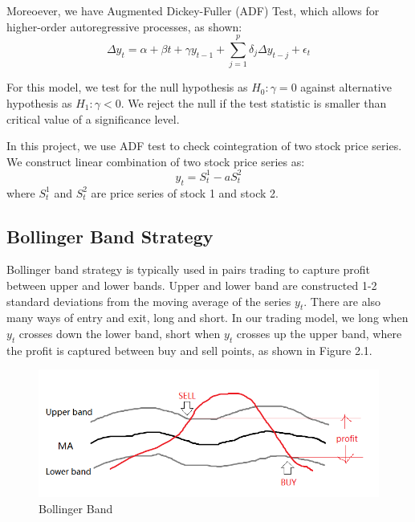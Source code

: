 Moreoever, we have Augmented Dickey-Fuller (ADF) Test, which allows for higher-order autoregressive processes, as shown:\cite{study:coint}
\begin{equation}
\Delta y_t = \alpha + \beta t + \gamma y_{t-1} + \sum_{j=1}^{p} \delta_j \Delta y_{t-j} + \epsilon_t
\end{equation}

For this model, we test for the null hypothesis as \(H_0: \gamma = 0\) against alternative hypothesis as \(H_1: \gamma < 0\). We reject the null if the test statistic is smaller than critical value of a significance level. 

In this project, we use ADF test to check cointegration of two stock price series. We construct linear combination of two stock price series as:
\begin{equation}
y_t = S_t^1 - a S_t^2
\end{equation}
where \(S_t^1\) and \(S_t^2\) are price series of stock 1 and stock 2.


\subsection{Bollinger Band Strategy}

Bollinger band strategy is typically used in pairs trading to capture profit between upper and lower bands. Upper and lower band are constructed 1-2 standard deviations from the moving average of the series \(y_t\).\cite{pairstrading} There are also many ways of entry and exit, long and short. In our trading model, we long when \(y_t\) crosses down the lower band, short when \(y_t\) crosses up the upper band, where the profit is captured between buy and sell points, as shown in Figure 2.1.

\begin{figure}[h!]
\centering
\includegraphics{background/images/bollinger.png}
\caption{Bollinger Band}
\label{fig:bollinger}
\end{figure}



